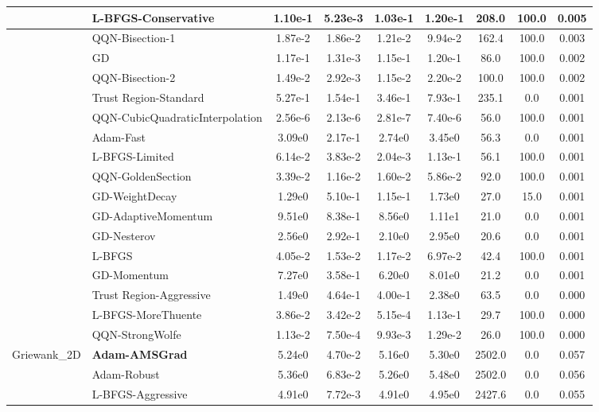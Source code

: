 \documentclass{article}
\begin{document}
\begin{longtable}{|l|l|c|c|c|c|c|c|c|}
 & L-BFGS-Conservative & 1.10e-1 & 5.23e-3 & 1.03e-1 & 1.20e-1 & 208.0 & 100.0 & 0.005 \\
\hline
 & QQN-Bisection-1 & 1.87e-2 & 1.86e-2 & 1.21e-2 & 9.94e-2 & 162.4 & 100.0 & 0.003 \\
\hline
 & GD & 1.17e-1 & 1.31e-3 & 1.15e-1 & 1.20e-1 & 86.0 & 100.0 & 0.002 \\
\hline
 & QQN-Bisection-2 & 1.49e-2 & 2.92e-3 & 1.15e-2 & 2.20e-2 & 100.0 & 100.0 & 0.002 \\
\hline
 & Trust Region-Standard & 5.27e-1 & 1.54e-1 & 3.46e-1 & 7.93e-1 & 235.1 & 0.0 & 0.001 \\
\hline
 & QQN-CubicQuadraticInterpolation & 2.56e-6 & 2.13e-6 & 2.81e-7 & 7.40e-6 & 56.0 & 100.0 & 0.001 \\
\hline
 & Adam-Fast & 3.09e0 & 2.17e-1 & 2.74e0 & 3.45e0 & 56.3 & 0.0 & 0.001 \\
\hline
 & L-BFGS-Limited & 6.14e-2 & 3.83e-2 & 2.04e-3 & 1.13e-1 & 56.1 & 100.0 & 0.001 \\
\hline
 & QQN-GoldenSection & 3.39e-2 & 1.16e-2 & 1.60e-2 & 5.86e-2 & 92.0 & 100.0 & 0.001 \\
\hline
 & GD-WeightDecay & 1.29e0 & 5.10e-1 & 1.15e-1 & 1.73e0 & 27.0 & 15.0 & 0.001 \\
\hline
 & GD-AdaptiveMomentum & 9.51e0 & 8.38e-1 & 8.56e0 & 1.11e1 & 21.0 & 0.0 & 0.001 \\
\hline
 & GD-Nesterov & 2.56e0 & 2.92e-1 & 2.10e0 & 2.95e0 & 20.6 & 0.0 & 0.001 \\
\hline
 & L-BFGS & 4.05e-2 & 1.53e-2 & 1.17e-2 & 6.97e-2 & 42.4 & 100.0 & 0.001 \\
\hline
 & GD-Momentum & 7.27e0 & 3.58e-1 & 6.20e0 & 8.01e0 & 21.2 & 0.0 & 0.001 \\
\hline
 & Trust Region-Aggressive & 1.49e0 & 4.64e-1 & 4.00e-1 & 2.38e0 & 63.5 & 0.0 & 0.000 \\
\hline
 & L-BFGS-MoreThuente & 3.86e-2 & 3.42e-2 & 5.15e-4 & 1.13e-1 & 29.7 & 100.0 & 0.000 \\
\hline
 & QQN-StrongWolfe & 1.13e-2 & 7.50e-4 & 9.93e-3 & 1.29e-2 & 26.0 & 100.0 & 0.000 \\
Griewank\_2D & \textbf{Adam-AMSGrad} & 5.24e0 & 4.70e-2 & 5.16e0 & 5.30e0 & 2502.0 & 0.0 & 0.057 \\
\hline
 & Adam-Robust & 5.36e0 & 6.83e-2 & 5.26e0 & 5.48e0 & 2502.0 & 0.0 & 0.056 \\
\hline
 & L-BFGS-Aggressive & 4.91e0 & 7.72e-3 & 4.91e0 & 4.95e0 & 2427.6 & 0.0 & 0.055 \\

\end{longtable}
\end{document}
